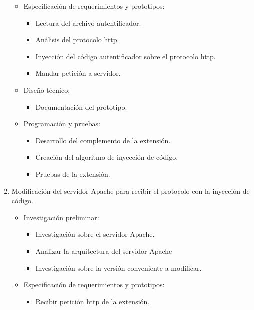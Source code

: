 \documentclass[12pt, a4paper, titlepage]{article}
\begin{document}
\begin{enumerate}
\begin{itemize}
                \item Especificación de requerimientos y prototipos: 
                \begin{itemize}
                    \item  Lectura del archivo autentificador.
                    \item  Análisis del protocolo \acrshort{http}. 
                    \item  Inyección del código autentificador sobre el protocolo \acrshort{http}.
                    \item Mandar petición a servidor.
                \end{itemize}
                \item Diseño técnico:
                \begin{itemize}
                    \item Documentación del prototipo. 
                \end{itemize}
                \item Programación y pruebas: 
                \begin{itemize}
                    \item Desarrollo del complemento de la extensión. 
                    \item Creación del algoritmo de inyección de código. 
                    \item Pruebas de la extensión. 
                \end{itemize}
            \end{itemize}
            \item Modificación del servidor Apache para recibir el protocolo con la inyección de código.
            \begin{itemize}
                \item  Investigación preliminar: 
                \begin{itemize}
                    \item Investigación sobre el servidor Apache.
                    \item Analizar la arquitectura del servidor Apache
                    \item Investigación sobre la versión conveniente a modificar.
                \end{itemize}
                \item Especificación de requerimientos y prototipos: 
                \begin{itemize}
                    \item Recibir petición \acrshort{http} de la extensión. 

\end{itemize}
\end{itemize}
\end{enumerate}
\end{document}
